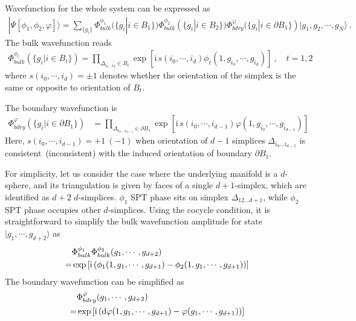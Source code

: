 \documentclass[reprint,amsmath,amssymb,aps,pra,]{revtex4-1}
\newcommand{\dd}{\mathrm{d}} %
\newcommand{\ii}{\mathrm{i}\,} %
\begin{document}
\begin{widetext}
  Wavefunction for the whole system can be expressed as
  \begin{align}
    |\Psi[\phi_1,\phi_2,\varphi]\rangle=\sum_{\{g_i\}}\Phi_{bulk}^{\phi_1}(\{g_i|i\in B_1\}) \Phi_{bulk}^{\phi_2}(\{g_i|i\in B_2\})
    \Phi_{bdry}^{\varphi}(\{g_i|i\in \partial B_1\})|g_1,g_2,\cdots,g_N\rangle~.
    \label{}
  \end{align}
  The bulk wavefunction reads
  \begin{align}
    \Phi_{bulk}^{\phi_t}(\{g_i|i\in B_t\})=\prod_{\Delta_{i_0\ldots i_d}\in B_t}\exp\left[ \ii s(i_0,\cdots,i_{d})\phi_t(1,g_{i_0},\cdots,g_{i_{d}})\right]~,\quad t=1,2
    \label{}
  \end{align}
  where $s(i_0,\cdots,i_{d})=\pm1$ denotes whether the orientation of the simplex is the same or opposite to orientation of $B_t$.

  The boundary wavefunction is
  \begin{align}
    \Phi_{bdry}^{\varphi}(\{g_i|i\in \partial B_1\})&=\prod_{\Delta_{i_0\ldots i_{d-1}}\in \partial B_1}\exp\left[ \ii s(i_0,\cdots,i_{d-1})\varphi(1,g_{i_0},\cdots,g_{i_{d-1}})\right]
    \label{}
  \end{align}
  Here, $s(i_0,\cdots,i_{d-1})=+1~(-1)$ when orientation of $d-1$ simplices $\Delta_{i_0\ldots i_{d-1}}$ is consistent~(inconsistent) with the induced orientation of boundary $\partial B_1$.
\end{widetext}
For simplicity, let us consider the case where the underlying manifold is a $d$-sphere, and its triangulation is given by faces of a single $d+1$-simplex, which are identified as $d+2$ $d$-simplices.
$\phi_1$ SPT phase sits on simplex $\Delta_{12\ldots {d+1}}$, while $\phi_2$ SPT phase occupies other $d$-simplices.
Using the cocycle condition, it is straightforward to simplify the bulk wavefunction amplitude for state $|g_1,\cdots,g_{d+2}\rangle$ as
\begin{align}
  &\Phi_{bulk}^{\phi_1}\Phi_{bulk}^{\phi_2}(g_1,\cdots,g_{d+2})\notag\\
  =&\exp\left[ \ii (\phi_1(1,g_1,\cdots,g_{d+1})-\phi_2(1,g_1,\cdots,g_{d+1})) \right]
  \label{eq:bulk_spt_wf}
\end{align}
The boundary wavefunction can be simplified as
\begin{align}
  &\Phi_{bdry}^\varphi(g_1,\cdots,g_{d+2})\notag\\
  =&\exp\left[ \ii (\dd\varphi(1,g_1,\cdots,g_{d+1})-\varphi(g_1,\cdots,g_{d+1}) ) \right]
  \label{eq:bdry_spt_wf}
\end{align}
\end{document}
